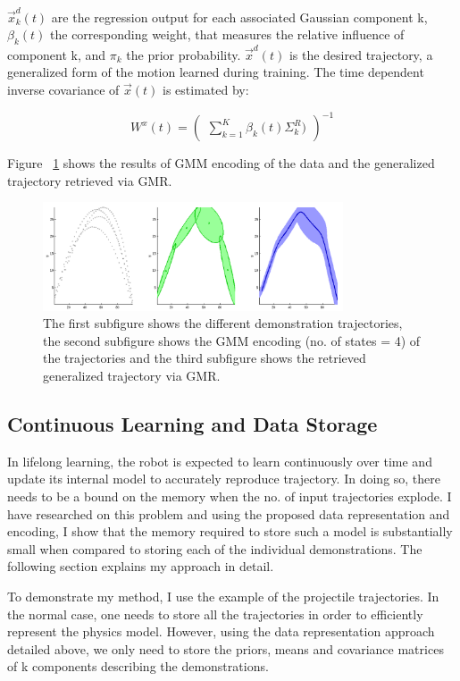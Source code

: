 \documentclass[conference]{IEEEtran}
\begin{document}
\begin{itemize}
{    $\vec{x}_{k}^{d}(t)$ are the regression output for each associated Gaussian component k, $\beta_{k}(t)$ the corresponding weight, that measures the relative influence of component k, and $\pi_{k}$ the prior probability. $\vec{x}^{d}(t)$ is the desired trajectory, a generalized form of the motion learned during training. The time dependent inverse covariance of $\vec{x}(t)$ is estimated by:

    \begin{equation}
        W^{x}(t)= \begin{pmatrix}{\sum_{k=1}^{K} \beta_{k}(t) {\Sigma}_{k}^{R})}\end{pmatrix}^{-1}
    \end{equation}
}
\end{itemize}

Figure ~\ref{fig:fig3} shows the results of GMM encoding of the data and the generalized trajectory retrieved via GMR.

\begin{figure}[!t]
\centering
\includegraphics[width=3.5in]{fig3}
\caption{The first subfigure shows the different demonstration trajectories, the second subfigure shows the GMM encoding (no. of states =  4) of the trajectories and the third subfigure shows the retrieved generalized trajectory via GMR.}
\label{fig:fig3}
\end{figure}

\subsection{Continuous Learning and Data Storage}
In lifelong learning, the robot is expected to learn continuously over time and update its internal model to accurately reproduce trajectory. In doing so, there needs to be a bound on the memory when the no. of input trajectories explode. I have researched on this problem and using the proposed data representation and encoding, I show that the memory required to store such a model is substantially small when compared to storing each of the individual demonstrations. The following section explains my approach in detail. 

To demonstrate my method, I use the example of the projectile trajectories. In the normal case, one needs to store all the trajectories in order to efficiently represent the physics model. However, using the data representation approach detailed above, we only need to store the priors, means and covariance matrices of k components describing the demonstrations. 
\end{document}
